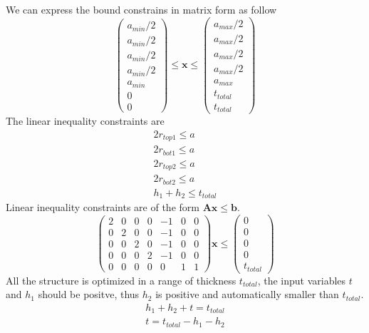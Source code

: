 \documentclass[12pt]{article}
\numberwithin{equation}{section}
\numberwithin{equation}{section}
\begin{document}
\begin{outline}[enumerate]
We can express the bound constrains in matrix form as follow
\begin{equation}
\left(
\begin{matrix}
a_{min}/2\\ 
a_{min}/2\\ 
a_{min}/2\\ 
a_{min}/2\\
a_{min}\\ 
0 \\
0 
\end{matrix} \right )
\leq \mathbf{x}
 \leq 
 \left(
\begin{matrix}
a_{max}/2 \\ a_{max}/2 \\ a_{max}/2 \\ a_{max}/2 \\ a_{max} \\ t_{total} \\t_{total}
\end{matrix} \right )
\end{equation}
The linear inequality constraints are 
\begin{align*} 
2r_{top1} \leq a \\
2r_{bot1} \leq a \\
2r_{top2} \leq a \\
2r_{bot2} \leq a \\
h_1+h_2 \leq t_{total} 
\end{align*}
Linear inequality constraints are of the form $\mathbf{A} \mathbf{x} \leq \mathbf{b}$.
\setcounter{MaxMatrixCols}{20}
\begin{equation}
\left(
\begin{matrix}
2 & 0 & 0 & 0 & -1 & 0 & 0  \\
0 & 2 & 0 & 0 & -1 & 0 & 0 \\
0 & 0 & 2 & 0 & -1& 0 & 0 \\
0 & 0 & 0 & 2 & -1& 0 & 0 \\
0 & 0 & 0 & 0 & 0 & 1 & 1
\end{matrix}
\right ) \mathbf{x}  \leq \left ( \begin{matrix} 0\\ 0\\ 0\\ 0\\ t_{total} \end{matrix} \right ) 
\end{equation}
All the structure is optimized in a range of thickness $t_{total}$, the input variables $t$ and $h_1$ should be positve, thus $h_2$ is positive and automatically smaller than $t_{total}$. 
\begin{align}
h_1+h_2+t=t_{total} \nonumber \\
t=t_{total}-h_1-h_2
 \end{align} 
 

\end{outline}
\end{document}
